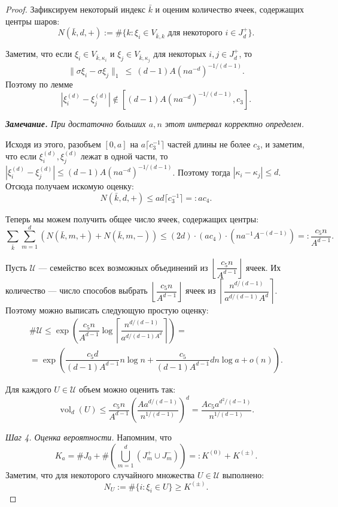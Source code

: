 \documentclass[12pt]{article}
\theoremstyle{plain}
\theoremstyle{definition}
\theoremstyle{remark}
\def\geq{\geqslant}
\def\leq{\leqslant}
\DeclareMathOperator{\vol}{vol}
\begin{document}
\begin{proof}
Зафиксируем некоторый индекс $\bar k$ и оценим количество ячеек, содержащих центры шаров: $$N(\bar k, d, +):= \#\{k\colon \xi_i\in V_{\bar k, k} \text{ для некоторого } i\in J_d^+\}.$$

Заметим, что если $\xi_i\in V_{\bar k, \kappa_i}$ и $\xi_j\in V_{\bar k, \kappa_j}$ для некоторых $i, j\in J_d^+$, то $$\|\sigma\xi_i - \sigma\xi_j\|_1~\leq~(d-1)A(na^{-d})^{-1/(d-1)}.$$ 
Поэтому по лемме $$|\xi_i^{(d)} - \xi_j^{(d)}| \not\in [(d-1)A(na^{-d})^{-1/(d-1)}, c_3].$$

{\it {\bf Замечание.} При достаточно больших $a, n$ этот интервал корректно определен.}

Исходя из этого, разобъем $[0,a]$ на $a\lceil c_3^{-1}\rceil$ частей длины не более $c_3$, и заметим, что если $\xi_i^{(d)}, \xi_j^{(d)}$ лежат в одной части, то $|\xi_i^{(d)} - \xi_j^{(d)}| \leq (d-1)A(na^{-d})^{-1/(d-1)}$. Поэтому тогда $|\kappa_i - \kappa_j|\leq d$. Отсюда получаем искомую оценку: $$N(\bar k, d, +)\leq ad \lceil c_3^{-1}\rceil =: ac_4.$$

Теперь мы можем получить общее число ячеек, содержащих центры: $$\sum_{\bar k}\sum_{m=1}^d (N(\bar k, m, +) + N(\bar k, m, -))\leq (2d)\cdot(ac_4)\cdot (na^{-1}A^{-(d-1)}) =: \dfrac{c_5 n}{A^{d-1}}.$$

Пусть $\mathcal{U}$ --- семейство всех возможных объединений из $\left\lfloor \dfrac{c_5 n}{A^{d-1}}\right\rfloor$ ячеек. Их количество --- число способов выбрать $\left\lfloor \dfrac{c_5 n}{A^{d-1}}\right\rfloor$ ячеек из $\left\lceil \dfrac{n^{d/(d-1)}}{a^{d/(d-1)}A^d}\right\rceil$. Поэтому можно выписать следующую простую оценку: \begin{multline*}
    \#\mathcal{U}\leq \exp \left(\dfrac{c_5 n}{A^{d-1}} \log \left\lceil \dfrac{n^{d/(d-1)}}{a^{d/(d-1)A^d}}\right\rceil \right) = \\
    =\exp \left(\dfrac{c_5d}{(d-1)A^{d-1}}n\log n + \dfrac{c_5}{(d-1)A^{d-1}}dn\log a + o(n)\right).
\end{multline*}{}

Для каждого $U\in \mathcal{U}$ объем можно оценить так: $$\vol_d (U)\leq \dfrac{c_5n}{A^{d-1}}\left(\dfrac{Aa^{d/(d-1)}}{n^{1/(d-1)}}\right)^d = \dfrac{Ac_5a^{d^2/(d-1)}}{n^{1/(d-1)}}.$$

{\it Шаг 4. Оценка вероятности.} Напомним, что $$K_a = \#J_0 + \#\left(\bigcup_{m=1}^d (J_m^+ \cup J_m^-)\right) =: K^{(0)} + K^{(\pm)}.$$
Заметим, что для некоторого случайного множества $U\in\mathcal{U}$ выполнено: $$N_U := \#\{i\colon \xi_i\in U\} \geq K^{(\pm)}.$$


\end{proof}
\end{document}
